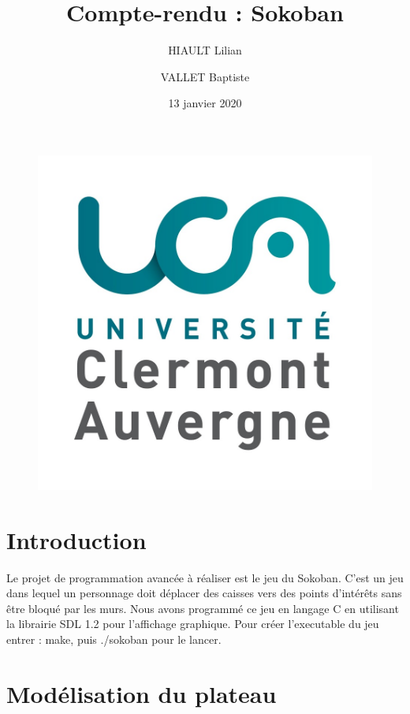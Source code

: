 \documentclass{article}
\title{Compte-rendu : Sokoban}
\author{HIAULT Lilian \and VALLET Baptiste}
\date{13 janvier 2020}
\begin{document}
\begin{figure}[t]
  \centerline{\includegraphics[scale=0.1]{logoUCA.jpg}}
\end{figure}

\maketitle

\tableofcontents

\newpage

\section*{Introduction}

Le projet de programmation avancée à réaliser est le jeu du Sokoban. C'est un jeu dans lequel un personnage doit déplacer des caisses vers des points d'intérêts sans être bloqué par les murs.
Nous avons programmé ce jeu en langage C en utilisant la librairie SDL 1.2 pour l'affichage graphique.
Pour créer l'executable du jeu entrer : make, puis ./sokoban pour le lancer.

\section{Modélisation du plateau}
\end{document}
